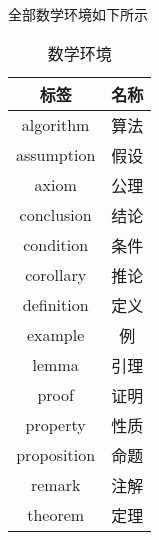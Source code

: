 全部数学环境如下所示

\begin{table}[htbp]
    \caption{数学环境}
    \label{tab:mathenv}
    \begin{tabular}{cc}
        \toprule
        标签 & 名称 \\
        \midrule
        algorithm & 算法 \\
        assumption & 假设 \\
        axiom & 公理 \\
        conclusion & 结论 \\
        condition & 条件 \\
        corollary & 推论 \\
        definition & 定义 \\
        example & 例 \\ 
        lemma & 引理 \\
        proof & 证明 \\
        property & 性质 \\
        proposition & 命题 \\
        remark & 注解 \\
        theorem & 定理 \\
        \bottomrule
    \end{tabular}
\end{table}

